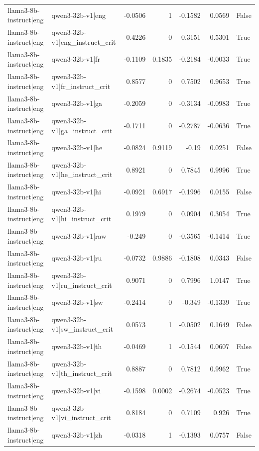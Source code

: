 \begin{table}
\begin{tabular}{l l r r r r l}
llama3-8b-instruct|eng & qwen3-32b-v1|eng & -0.0506 & 1 & -0.1582 & 0.0569 & False \\
llama3-8b-instruct|eng & qwen3-32b-v1|eng_instruct_crit & 0.4226 & 0 & 0.3151 & 0.5301 & True \\
llama3-8b-instruct|eng & qwen3-32b-v1|fr & -0.1109 & 0.1835 & -0.2184 & -0.0033 & True \\
llama3-8b-instruct|eng & qwen3-32b-v1|fr_instruct_crit & 0.8577 & 0 & 0.7502 & 0.9653 & True \\
llama3-8b-instruct|eng & qwen3-32b-v1|ga & -0.2059 & 0 & -0.3134 & -0.0983 & True \\
llama3-8b-instruct|eng & qwen3-32b-v1|ga_instruct_crit & -0.1711 & 0 & -0.2787 & -0.0636 & True \\
llama3-8b-instruct|eng & qwen3-32b-v1|he & -0.0824 & 0.9119 & -0.19 & 0.0251 & False \\
llama3-8b-instruct|eng & qwen3-32b-v1|he_instruct_crit & 0.8921 & 0 & 0.7845 & 0.9996 & True \\
llama3-8b-instruct|eng & qwen3-32b-v1|hi & -0.0921 & 0.6917 & -0.1996 & 0.0155 & False \\
llama3-8b-instruct|eng & qwen3-32b-v1|hi_instruct_crit & 0.1979 & 0 & 0.0904 & 0.3054 & True \\
llama3-8b-instruct|eng & qwen3-32b-v1|raw & -0.249 & 0 & -0.3565 & -0.1414 & True \\
llama3-8b-instruct|eng & qwen3-32b-v1|ru & -0.0732 & 0.9886 & -0.1808 & 0.0343 & False \\
llama3-8b-instruct|eng & qwen3-32b-v1|ru_instruct_crit & 0.9071 & 0 & 0.7996 & 1.0147 & True \\
llama3-8b-instruct|eng & qwen3-32b-v1|sw & -0.2414 & 0 & -0.349 & -0.1339 & True \\
llama3-8b-instruct|eng & qwen3-32b-v1|sw_instruct_crit & 0.0573 & 1 & -0.0502 & 0.1649 & False \\
llama3-8b-instruct|eng & qwen3-32b-v1|th & -0.0469 & 1 & -0.1544 & 0.0607 & False \\
llama3-8b-instruct|eng & qwen3-32b-v1|th_instruct_crit & 0.8887 & 0 & 0.7812 & 0.9962 & True \\
llama3-8b-instruct|eng & qwen3-32b-v1|vi & -0.1598 & 0.0002 & -0.2674 & -0.0523 & True \\
llama3-8b-instruct|eng & qwen3-32b-v1|vi_instruct_crit & 0.8184 & 0 & 0.7109 & 0.926 & True \\
llama3-8b-instruct|eng & qwen3-32b-v1|zh & -0.0318 & 1 & -0.1393 & 0.0757 & False \\

\end{tabular}
\end{table}
